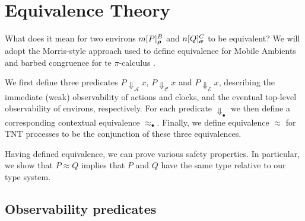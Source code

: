 \documentclass[orivec]{llncs}
\newcommand{\Reveals}[1]{\mathrel{\Downarrow_{#1}}}
\newcommand{\RevealsA}{\Reveals{\mathcal{A}}}
\newcommand{\RevealsC}{\Reveals{\mathcal{C}}}
\newcommand{\RevealsE}{\Reveals{\mathcal{E}}}
\newcommand{\Eq}{\approx}
\begin{document}
\section{Equivalence Theory}
\label{sec:equivalence-theory}

What does it mean for two environs $\locv{m}{P}{B}{\vec\rho}$ and
$\locv{n}{Q}{C}{\vec\sigma}$ to be equivalent? We will adopt the Morris-style
approach \cite{Mor68} used to define equivalence for Mobile Ambients \cite{GC99}
and barbed congruence for te $\pi$-calculus \cite{SW01}.

We first define three predicates $P \RevealsA x$, $P \RevealsC x$ and $P
\RevealsE x$, describing the immediate (weak) observability of actions and
clocks, and the eventual top-level observability of environs, respectively. For
each predicate $\Reveals{\bullet}$ we then define a corresponding contextual
equivalence $\Eq_{\bullet}$. Finally, we define equivalence $\Eq$ for TNT
processes to be the conjunction of these three equivalences.

Having defined equivalence, we can prove various safety properties. In
particular, we show that $P \Eq Q$ implies that $P$ and $Q$ have the same type
relative to our type system.

\subsection{Observability predicates}
\label{sec:observability-predicates}








\end{document}

